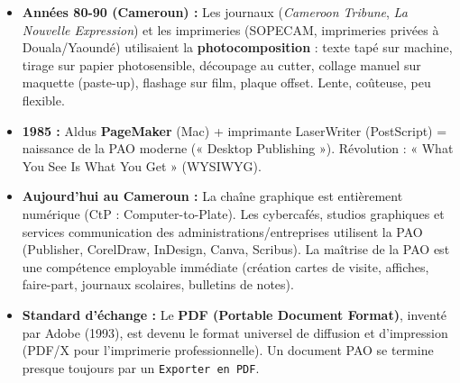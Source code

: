 \documentclass[11pt]{article}
\begin{document}
\begin{savaistu}
\begin{itemize}
\item \textbf{Années 80-90 (Cameroun) :} Les journaux (\textit{Cameroon Tribune}, \textit{La Nouvelle Expression}) et les imprimeries (SOPECAM, imprimeries privées à Douala/Yaoundé) utilisaient la \textbf{photocomposition} : texte tapé sur machine, tirage sur papier photosensible, découpage au cutter, collage manuel sur maquette (paste-up), flashage sur film, plaque offset. Lente, coûteuse, peu flexible.
\item \textbf{1985 :} Aldus \textbf{PageMaker} (Mac) + imprimante LaserWriter (PostScript) = naissance de la PAO moderne (« Desktop Publishing »). Révolution : « What You See Is What You Get » (WYSIWYG).
\item \textbf{Aujourd'hui au Cameroun :} La chaîne graphique est entièrement numérique (CtP : Computer-to-Plate). Les cybercafés, studios graphiques et services communication des administrations/entreprises utilisent la PAO (Publisher, CorelDraw, InDesign, Canva, Scribus). La maîtrise de la PAO est une compétence employable immédiate (création cartes de visite, affiches, faire-part, journaux scolaires, bulletins de notes).
\item \textbf{Standard d'échange :} Le \textbf{PDF (Portable Document Format)}, inventé par Adobe (1993), est devenu le format universel de diffusion et d'impression (PDF/X pour l'imprimerie professionnelle). Un document PAO se termine presque toujours par un \texttt{Exporter en PDF}.
\end{itemize}
\end{savaistu}
\end{document}
